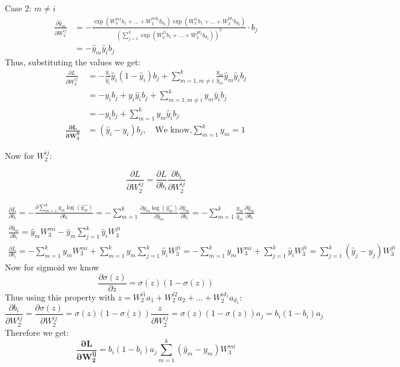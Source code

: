 \documentclass[a4paper]{article}
\theoremstyle{definition}
\newenvironment{soln}{
    \leavevmode\color{blue}\ignorespaces
}{}
\begin{document}
\begin{enumerate}
\begin{soln}
        Case 2: $m\neq i$
        \begin{align*}
            \frac{\partial \hat y_m}{\partial W_3^{ij}} &= - \frac{\exp{(W_3^{m1}b_1 + \ldots + W_3^{md_2}b_{d_2})}\exp{(W_3^{i1}b_1 + \ldots + W_3^{id_2}b_{d_2})}}{(\sum_{j=1}^{k}\exp{(W_3^{j1}b_1 + \ldots + W_3^{jd_2}b_{d_2})})^2}\cdot b_j \\
            &= - \hat y_m \hat y_i b_j
        \end{align*}
        Thus, substituting the values we get:
        \begin{align*}
            \frac{\partial L}{\partial W_3^{ij}} &= -\frac{y_i}{\hat y_i}\hat y_i (1 - \hat y_i) b_j + \sum_{m=1,m\neq i}^k \frac{y_m }{\hat y_m} \hat y_m \hat y_i b_j \\
            &= -y_i b_j + y_i \hat y_i b_j + \sum_{m=1,m\neq i}^k y_m \hat y_i b_j \\
            &= -y_i b_j + \sum_{m=1}^k y_m \hat y_i b_j \\
            \mathbf{\frac{\partial L}{\partial W_3^{ij}}} &= (\hat y_i - y_i)b_j, \quad \text{We know,} \sum_{m=1}^k y_m = 1
        \end{align*}

        Now for $W_2^{ij}$:
        
        $$
            \frac{\partial L}{\partial W_2^{ij}} = \frac{\partial L}{\partial b_i}\frac{\partial b_i}{\partial W_2^{ij}}
        $$
        
        \begin{gather*}
            \frac{\partial L}{\partial b_i} = -\frac{\partial \sum_{m=1}^k y_m \log(\hat{y_m})}{\partial b_i} = -\sum_{m=1}^k \frac{\partial y_m \log(\hat{y_m})}{\partial \hat y_m} \frac{\partial \hat y_m}{\partial b_i} = -\sum_{m=1}^k \frac{y_m }{\hat y_m} \frac{\partial \hat y_m}{\partial b_i} \\
            \frac{\partial \hat y_m}{\partial b_i} = \hat y_m W_3^{mi} - \hat y_m \sum_{j=1}^{k} \hat y_i W_3^{ji} \\
            \frac{\partial L}{\partial b_i} = -\sum_{m=1}^k y_m W_3^{mi} + \sum_{m=1}^k y_m \sum_{j=1}^{k} \hat y_i W_3^{ji} = -\sum_{m=1}^k y_m W_3^{mi} + \sum_{j=1}^{k} \hat y_i W_3^{ji} = \sum_{j=1}^k (\hat y_j -y_j) W_3^{ji}
        \end{gather*}
        Now for sigmoid we know 
        $$
            \frac{\partial \sigma(z)}{\partial z} = \sigma(z)(1-\sigma(z))
        $$
        Thus using this property with $z = W_2^{i1}a_1 + W_2^{i2}a_2 + \ldots + W_2^{id_1}a_{d_1}$:
        $$
            \frac{\partial b_i}{\partial W_2^{ij}} = \frac{\partial \sigma(z)}{\partial W_2^{ij}} = \sigma(z)(1-\sigma(z))\frac{z}{\partial W_2^{ij}} = \sigma(z)(1-\sigma(z))a_j = b_i(1-b_i)a_j
        $$
        Therefore we get:
        $$
            \mathbf{\frac{\partial L}{\partial W_2^{ij}}} = b_i(1-b_i)a_j\sum_{m=1}^k (\hat y_m -y_m) W_3^{mi}
        $$


\end{soln}
\end{enumerate}
\end{document}
